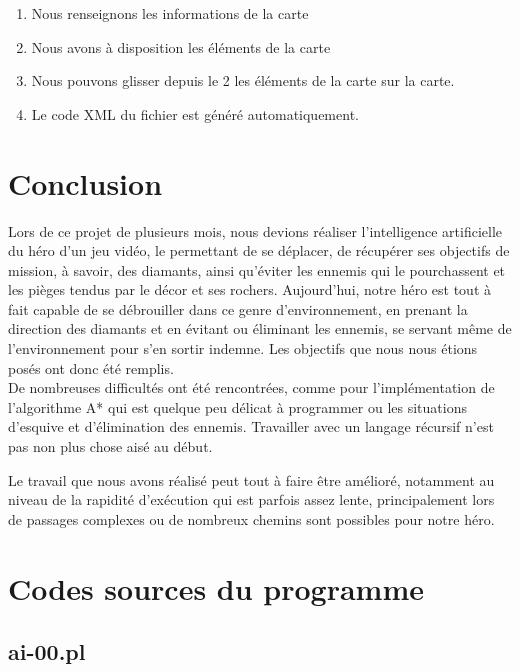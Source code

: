 \documentclass[a4paper,11pt]{article}
\begin{document}
	\begin{enumerate}
		\item Nous renseignons les informations de la carte
		\item Nous avons \`a disposition les \'el\'ements de la carte
		\item Nous pouvons glisser depuis le \og{} 2 \fg{} les \'el\'ements de la carte sur la carte.
		\item Le code XML du fichier est g\'en\'er\'e automatiquement.
	\end{enumerate}
	
	\newpage
	\section{Conclusion}
	
Lors de ce projet de plusieurs mois, nous devions r\'ealiser l'intelligence artificielle du h\'ero d'un jeu vid\'eo, le permettant de se d\'eplacer, de r\'ecup\'erer ses objectifs de mission, \`a savoir, des diamants, ainsi qu'\'eviter les ennemis qui le pourchassent et les pi\`eges tendus par le d\'ecor et ses rochers. Aujourd'hui, notre h\'ero est tout \`a fait capable de se d\'ebrouiller dans ce genre d'environnement, en prenant la direction des diamants et en \'evitant ou \'eliminant les ennemis, se servant m\^eme de l'environnement pour s'en sortir indemne. Les objectifs que nous nous \'etions pos\'es ont donc \'et\'e remplis.\\

De nombreuses difficult\'es ont \'et\'e rencontr\'ees, comme pour l'impl\'ementation de l'algorithme A* qui est quelque peu d\'elicat \`a programmer ou les situations d'esquive et d'\'elimination des ennemis. Travailler avec un langage r\'ecursif n'est pas non plus chose ais\'e au d\'ebut.

Le travail que nous avons r\'ealis\'e peut tout \`a faire \^etre am\'elior\'e, notamment au niveau de la rapidit\'e d'ex\'ecution qui est parfois assez lente, principalement lors de passages complexes ou de nombreux chemins sont possibles pour notre h\'ero.  
	


\newpage
\section{Codes sources du programme}

\subsection{ai-00.pl}

\end{document}
